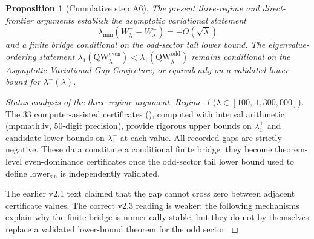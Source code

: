 \documentclass[12pt,a4paper]{article}
\newtheorem{proposition}[theorem]{Proposition}
\theoremstyle{definition}
\theoremstyle{remark}
\begin{document}
\begin{proposition}[Cumulative step A6]
\label{prop:A6}
The present three-regime and direct-frontier arguments establish the asymptotic
variational statement
\[
  \lambda_{\min}(W^+_\lambda-W^-_\lambda)=-\Theta(\sqrt{\lambda})
\]
and a finite bridge conditional on the odd-sector tail lower bound.  The
eigenvalue-ordering statement
$\lambda_1(\mathrm{QW}_\lambda^{\mathrm{even}})
<\lambda_1(\mathrm{QW}_\lambda^{\mathrm{odd}})$ remains conditional on the
Asymptotic Variational Gap Conjecture, or equivalently on a validated lower
bound for $\lambda_1^-(\lambda)$.
\end{proposition}

\begin{proof}[Status analysis of the three-regime argument]
\emph{Regime~1} ($\lambda \in [100,\, 1{,}300{,}000]$). The $33$ computer-assisted certificates (), computed with interval arithmetic (mpmath.iv, 50-digit precision), provide rigorous upper bounds on $\lambda_1^+$ and candidate lower bounds on $\lambda_1^-$ at each value. All recorded gaps are strictly negative. These data constitute a conditional finite bridge: they become theorem-level even-dominance certificates once the odd-sector tail lower bound used to define $\mathrm{lower}_{\sin}$ is independently validated.

The earlier v2.1 text claimed that the gap cannot cross zero between adjacent certificate values. The correct v2.3 reading is weaker: the following mechanisms explain why the finite bridge is numerically stable, but they do not by themselves replace a validated lower-bound theorem for the odd sector.


\end{proof}
\end{document}
